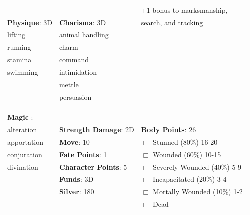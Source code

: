 \documentclass[10pt]{article}
\begin{document}
\begin{table}
\begin{tabular}{m{156pt} m{156pt} m{156pt}}
 \hrulefill &  \hrulefill & +1 bonus to marksmanship, \hrulefill \\


\textbf{Physique}: 3D \hrulefill & \textbf{Charisma}: 3D \hrulefill     & search, and tracking \hrulefill \\

lifting              \hrulefill & animal handling      \hrulefill &  \hrulefill \\

running              \hrulefill & charm                \hrulefill &  \hrulefill \\

stamina              \hrulefill & command              \hrulefill &  \hrulefill \\

swimming             \hrulefill & intimidation         \hrulefill &  \hrulefill \\

 \hrulefill & mettle               \hrulefill &  \hrulefill \\

 \hrulefill & persuasion           \hrulefill &  \hrulefill \\

 \hrulefill &  \hrulefill &  \hrulefill \\

 \hrulefill &  \hrulefill &  \hrulefill \\

                                  &                                 &                             \\
\textbf{Magic }:  \hrulefill  &                                 &                             \\
alteration           \hrulefill & \textbf{Strength Damage}: 2D \hrulefill                             & \textbf{Body Points}: 26 \hrulefill \\
apportation          \hrulefill                        & \textbf{Move}:             10             \hrulefill    & $\Box$ Stunned \footnotesize{(80\%)} \hfill 16-20 \\
conjuration          \hrulefill                        & \textbf{Fate Points}:      1      \hrulefill    & $\Box$ Wounded \footnotesize{(60\%)} \hfill 10-15 \\
divination           \hrulefill                        & \textbf{Character Points}: 5 \hrulefill    & $\Box$ Severely Wounded \footnotesize{(40\%)} \hfill 5-9 \\
 \hrulefill                        & \textbf{Funds}:            3D            \hrulefill    & $\Box$ Incapacitated \footnotesize{(20\%)} \hfill 3-4 \\
 \hrulefill                        & \textbf{Silver}:           180           \hrulefill    & $\Box$ Mortally Wounded \footnotesize{(10\%)} \hfill 1-2 \\
 \hrulefill                        &  \hrulefill                                                       & $\Box$ Dead   \\
\end{tabular}
\end{table}
\end{document}
